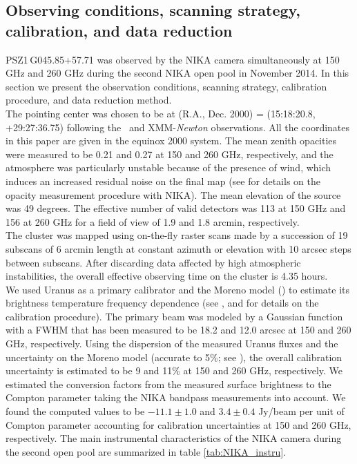 \documentclass[traditabstract]{aa}
\begin{document}
\subsection{Observing conditions, scanning strategy, calibration, and data reduction}
\mbox{PSZ1\,G045.85+57.71} was observed by the NIKA camera simultaneously at 150 GHz and 260 GHz during the second NIKA open pool in November 2014. In this section we present the observation conditions, scanning strategy, calibration procedure, and data reduction method.\\
\indent The pointing center was chosen to be at (R.A., Dec. 2000) = (15:18:20.8, +29:27:36.75) following the \planck\ and XMM-{\it Newton} observations. All the coordinates in this paper are given in the equinox 2000 system. The mean zenith opacities were measured to be 0.21 and 0.27 at 150 and 260 GHz, respectively,  and the atmosphere was particularly unstable because of the presence of wind, which induces an increased residual noise on the final map (see \citealt{NIKA_calib} for details on the opacity measurement procedure with NIKA). The mean elevation of the source was 49 degrees. The effective number of valid detectors was 113 at 150 GHz and 156 at 260 GHz for a field of view of 1.9 and 1.8 arcmin, respectively.\\
\indent The cluster was mapped using on-the-fly raster scans made by a succession of 19 subscans of 6 arcmin length at constant azimuth or elevation with 10 arcsec steps between subscans. After discarding data affected by high atmospheric instabilities, the overall effective observing time on the cluster is 4.35 hours.\\
\indent We used Uranus as a primary calibrator and the Moreno model (\citealt{model_moreno}) to estimate its brightness temperature frequency dependence (see \citealt{RXJ1347NIKA}, \citealt{these_remi} and \citealt{NIKA_calib} for details on the calibration procedure). The primary beam was modeled by a Gaussian function with a FWHM that has been measured to be 18.2 and 12.0 arcsec at 150 and 260 GHz, respectively. Using the dispersion of the measured Uranus fluxes and the uncertainty on the Moreno model (accurate to 5\%; see \citealt{Planck_calib}), the overall calibration uncertainty is estimated to be 9 and 11\% at 150 and 260 GHz, respectively. We estimated the conversion factors from the measured surface brightness to the Compton parameter taking the NIKA bandpass measurements into account. We found the computed values to be $-11.1\pm 1.0$ and $3.4\pm 0.4$ Jy/beam per unit of Compton parameter accounting for calibration uncertainties at 150 and 260 GHz, respectively. The main instrumental characteristics of the NIKA camera during the second open pool are summarized in table \ref{tab:NIKA_instru}.\\
\end{document}
